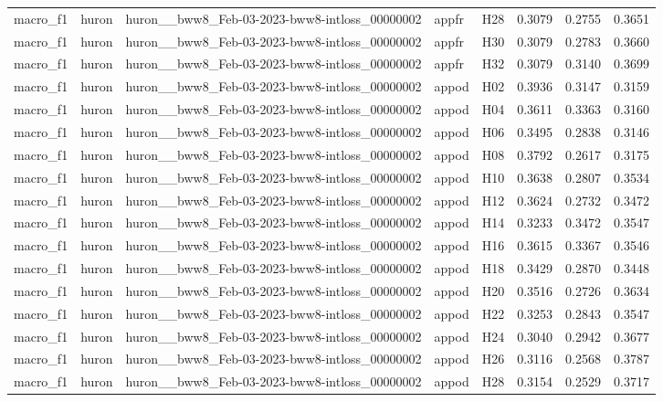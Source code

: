\begin{table}[tbp]
\begin{tabular}{lllllrrr}
macro\_f1 & huron & huron\_\_bww8\_Feb-03-2023-bww8-intloss\_00000002 & appfr & H28 & 0.3079 & 0.2755 & 0.3651 \\
macro\_f1 & huron & huron\_\_bww8\_Feb-03-2023-bww8-intloss\_00000002 & appfr & H30 & 0.3079 & 0.2783 & 0.3660 \\
macro\_f1 & huron & huron\_\_bww8\_Feb-03-2023-bww8-intloss\_00000002 & appfr & H32 & 0.3079 & 0.3140 & 0.3699 \\
macro\_f1 & huron & huron\_\_bww8\_Feb-03-2023-bww8-intloss\_00000002 & appod & H02 & 0.3936 & 0.3147 & 0.3159 \\
macro\_f1 & huron & huron\_\_bww8\_Feb-03-2023-bww8-intloss\_00000002 & appod & H04 & 0.3611 & 0.3363 & 0.3160 \\
macro\_f1 & huron & huron\_\_bww8\_Feb-03-2023-bww8-intloss\_00000002 & appod & H06 & 0.3495 & 0.2838 & 0.3146 \\
macro\_f1 & huron & huron\_\_bww8\_Feb-03-2023-bww8-intloss\_00000002 & appod & H08 & 0.3792 & 0.2617 & 0.3175 \\
macro\_f1 & huron & huron\_\_bww8\_Feb-03-2023-bww8-intloss\_00000002 & appod & H10 & 0.3638 & 0.2807 & 0.3534 \\
macro\_f1 & huron & huron\_\_bww8\_Feb-03-2023-bww8-intloss\_00000002 & appod & H12 & 0.3624 & 0.2732 & 0.3472 \\
macro\_f1 & huron & huron\_\_bww8\_Feb-03-2023-bww8-intloss\_00000002 & appod & H14 & 0.3233 & 0.3472 & 0.3547 \\
macro\_f1 & huron & huron\_\_bww8\_Feb-03-2023-bww8-intloss\_00000002 & appod & H16 & 0.3615 & 0.3367 & 0.3546 \\
macro\_f1 & huron & huron\_\_bww8\_Feb-03-2023-bww8-intloss\_00000002 & appod & H18 & 0.3429 & 0.2870 & 0.3448 \\
macro\_f1 & huron & huron\_\_bww8\_Feb-03-2023-bww8-intloss\_00000002 & appod & H20 & 0.3516 & 0.2726 & 0.3634 \\
macro\_f1 & huron & huron\_\_bww8\_Feb-03-2023-bww8-intloss\_00000002 & appod & H22 & 0.3253 & 0.2843 & 0.3547 \\
macro\_f1 & huron & huron\_\_bww8\_Feb-03-2023-bww8-intloss\_00000002 & appod & H24 & 0.3040 & 0.2942 & 0.3677 \\
macro\_f1 & huron & huron\_\_bww8\_Feb-03-2023-bww8-intloss\_00000002 & appod & H26 & 0.3116 & 0.2568 & 0.3787 \\
macro\_f1 & huron & huron\_\_bww8\_Feb-03-2023-bww8-intloss\_00000002 & appod & H28 & 0.3154 & 0.2529 & 0.3717 \\

\end{tabular}
\end{table}
